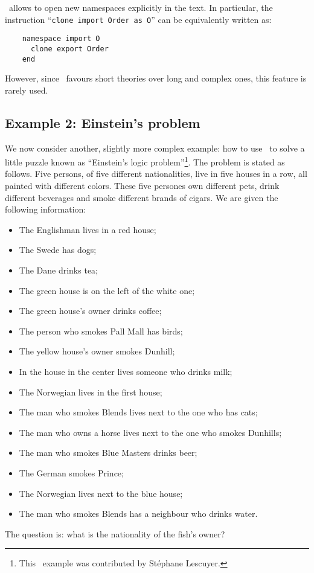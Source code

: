 \why\ allows to open new namespaces explicitly in the text. In particular,
the instruction ``\texttt{clone import Order as O}'' can be equivalently
written as:
\begin{verbatim}
    namespace import O
      clone export Order
    end
\end{verbatim}
However, since \why\ favours short theories over long and complex ones,
this feature is rarely used.

\subsection{Example 2: Einstein's problem}

We now consider another, slightly more complex example: how to use \why\
to solve a little puzzle known as ``Einstein's logic
problem''\footnote{This \why\ example was contributed by St\'ephane Lescuyer.}.
The problem is stated as follows. Five persons, of five
different nationalities, live in five houses in a row, all
painted with different colors.
These five persones own different pets, drink different beverages and
smoke different brands of cigars.
We are given the following information:
\begin{itemize}
\item The Englishman lives in a red house;

\item The Swede has dogs;

\item The Dane drinks tea;

\item The green house is on the left of the white one;

\item The green house's owner drinks coffee;

\item The person who smokes Pall Mall has birds;

\item The yellow house's owner smokes Dunhill;

\item In the house in the center lives someone who drinks milk;

\item The Norwegian lives in the first house;

\item The man who smokes Blends lives next to the one who has cats;

\item The man who owns a horse lives next to the one who smokes Dunhills;

\item The man who smokes Blue Masters drinks beer;

\item The German smokes Prince;

\item The Norwegian lives next to the blue house;

\item The man who smokes Blends has a neighbour who drinks water.
\end{itemize}
The question is: what is the nationality of the fish's owner?

